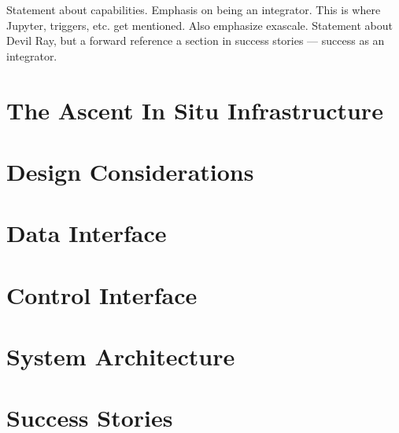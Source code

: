 Statement about capabilities.  Emphasis on being an integrator.
This is where Jupyter, triggers, etc. get mentioned.  Also emphasize
exascale.
Statement about Devil Ray, but a forward reference a section in success stories --- success as an integrator.



\section{The Ascent In Situ Infrastructure}
\label{ascent_overview}


\section{Design Considerations}
\label{ascent_design_considerations}



\section{Data Interface}
\label{ascent_data}


\section{Control Interface}
\label{ascent_control}


\section{System Architecture}
\label{ascent_architecture}


\section{Success Stories}
\label{ascent_success}

